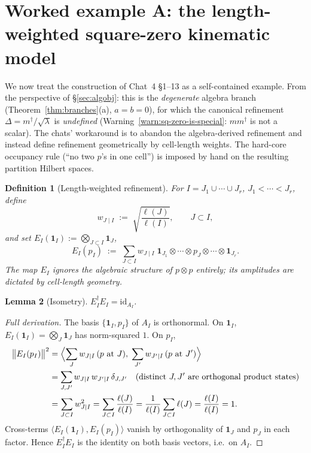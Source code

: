 \documentclass[11pt,a4paper]{article}
\newtheorem{definition}{Definition}[section]
\newtheorem{lemma}[definition]{Lemma}
\theoremstyle{definition}
\newcommand{\id}{\mathrm{id}}
\newcommand{\one}{\mathbf{1}}
\begin{document}
\section{Worked example A: the length-weighted square-zero kinematic model}\label{sec:square-zero}

We now treat the construction of Chat~4 \S1--13 as a self-contained
example. From the perspective of \S\ref{sec:algobj}: this is the
\emph{degenerate} algebra branch (Theorem~\ref{thm:branches}(a), $a=b=0$),
for which the canonical refinement $\Delta = m^{\dagger}/\sqrt{\lambda}$ is
\emph{undefined} (Warning~\ref{warn:sq-zero-is-special}: $mm^{\dagger}$ is
not a scalar). The chats' workaround is to abandon the algebra-derived
refinement and instead define refinement geometrically by cell-length
weights. The hard-core occupancy rule (``no two $p$'s in one cell'') is
imposed by hand on the resulting partition Hilbert spaces.

\begin{definition}[Length-weighted refinement]\label{def:lenref}
For $I = J_1\cup\cdots\cup J_r$, $J_1<\cdots<J_r$, define
\[
w_{J\mid I} \;:=\; \sqrt{\frac{\ell(J)}{\ell(I)}}, \qquad J\subset I,
\]
and set $E_I(\one_I) := \bigotimes_{J\subset I}\one_J$,
\[
E_I(p_I) \;:=\; \sum_{J\subset I} w_{J\mid I}\;
\one_{J_1}\otimes\cdots\otimes p_{J}\otimes\cdots\otimes\one_{J_r}.
\]
The map $E_I$ ignores the algebraic structure of $p\otimes p$ entirely; its
amplitudes are dictated by cell-length geometry.
\end{definition}

\begin{lemma}[Isometry]\label{lem:sqzero-isom}
$E_I^\dagger E_I = \id_{A_I}$.
\end{lemma}

\begin{proof}[Full derivation]
The basis $\{\one_I, p_I\}$ of $A_I$ is orthonormal. On $\one_I$,
$E_I(\one_I) = \bigotimes_J \one_J$ has norm-squared $1$. On $p_I$,
\begin{align*}
\bigl\|E_I(p_I)\bigr\|^{2}
&= \Bigl\langle \sum_{J} w_{J\mid I}\,(\text{$p$ at $J$}),\;
                \sum_{J'} w_{J'\mid I}\,(\text{$p$ at $J'$})\Bigr\rangle\\
&= \sum_{J,J'} w_{J\mid I}\,w_{J'\mid I}\,\delta_{J,J'} \quad\text{(distinct $J,J'$ are orthogonal product states)}\\
&= \sum_{J\subset I} w_{J\mid I}^{2}
 = \sum_{J\subset I} \frac{\ell(J)}{\ell(I)}
 = \frac{1}{\ell(I)}\sum_{J\subset I}\ell(J)
 = \frac{\ell(I)}{\ell(I)} = 1.
\end{align*}
Cross-terms $\langle E_I(\one_I), E_I(p_I)\rangle$ vanish by orthogonality of
$\one_J$ and $p_J$ in each factor. Hence $E_I^\dagger E_I$ is the identity on
both basis vectors, i.e.\ on $A_I$.
\end{proof}
\end{document}
